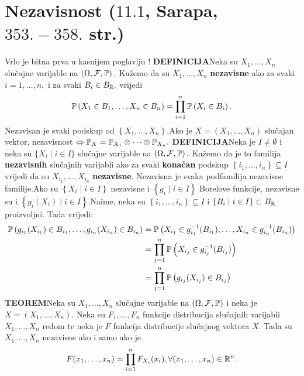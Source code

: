 \documentclass{article}
\begin{document}
\section{Nezavisnost (\textsection \(11.1\), Sarapa, \(353.-358.\) str.)} Vrlo je bitna prva  u kasnijem poglavlju  !\newline\newline 
\textbf{DEFINICIJA}\newline Neka su \(X_1,\ldots, X_n\) slučajne varijable na \(\left(\Omega,\mathcal F,\Bbb P\right).\) Kažemo da su \(X_1,\ldots, X_n\) \textbf{nezavisne} ako za svaki \(i=1,\ldots,n,\) i za svaki \(B_i\in B_{\Bbb R},\) vrijedi \[\Bbb P\left(X_1\in B_1,\ldots, X_n\in B_n\right)=\prod_{i=1}^n\Bbb P\left(X_i\in B_i\right).\] Nezavisan je svaki podskup od \(\left\{X_1,\ldots,X_n\right\}.\)\newline Ako je \(X=(X_1,\ldots,X_n)\) slučajan vektor, nezavisnost \(\Leftrightarrow\Bbb P_X=\Bbb P_{X_1}\otimes\cdots\otimes\Bbb P_{X_n}.\)\newline\newline
\textbf{DEFINICIJA}\newline Neka je \(I\ne\emptyset\) i neka su \(\{X_i\mid i\in I\}\) slučajne varijable na \(\left(\Omega,\mathcal F,\Bbb P\right).\) Kažemo da je to familija \textbf{nezavisnih} slučajnih varijabli ako za svaki \textbf{konačan} podskup \(\left\{i_1,\ldots,i_n\right\}\subseteq I\) vrijedi da su \(X_{i_1},\ldots,X_{i_n}\) \textbf{nezavisne}. \newline Nezavisna je svaka podfamilija nezavisne familije.\newline Ako su \(\left\{X_i\mid i\in I\right\}\) nezavisne i \(\left\{g_i\mid i\in I\right\}\) Borelove funkcije, nezavisne su i \(\left\{g_i(X_i)\mid i\in I\right\}.\)Naime, neka su \(\left\{i_1,\ldots,i_n\right\}\subseteq I\) i \(\left\{B_i\mid i\in I\right\}\subset B_{\Bbb R}\) proizvoljni. Tada vrijedi: \[\begin{aligned}\Bbb P\left(g_{i_1}(X_{i_1})\in B_{i_1},\ldots, g_{i_n}(X_{i_n})\in B_{i_n}\right)&=\Bbb P\left(X_{i_1}\in g_{i_1}^{-1}(B_{i_1}),\ldots,X_{i_n}\in g_{i_n}^{-1}(B_{i_n})\right)\\&=\prod_{j=1}^n\Bbb P\left(X_{i_j}\in g_{i_j}^{-1}(B_{i_j})\right)\\&=\prod_{j=1}^n\Bbb P\left(g_{i_j}(X_{i_j})\in B_{i_j}\right)\end{aligned}\] 
\textbf{TEOREM}\newline Neka su \(X_1,\ldots,X_n\) slučajne varijable na \(\left(\Omega,\mathcal F,\Bbb P\right)\) i neka je \(X=(X_1,\ldots,X_n).\) Neka su \(F_1,\ldots, F_n\) funkcije distribucija slučajnih varijabli \(X_1,\ldots,X_n\) redom te neka je \(F\) funkcija distribucije slučajnog vektora \(X.\) Tada su \(X_1,\ldots,X_n\) nezavisne ako i samo ako je \[F(x_1,\ldots,x_n)=\prod_{i=1}^nF_{X_i}(x_i),\forall (x_1,\ldots,x_n)\in\Bbb R^n.\] 
\end{document}
